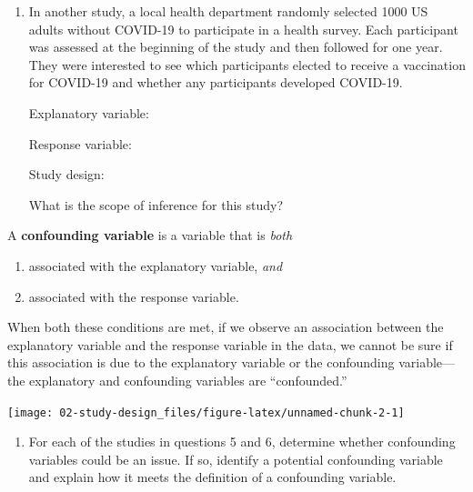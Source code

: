 \documentclass[
]{report}
\providecommand{\tightlist}{%
  \setlength{\itemsep}{0pt}\setlength{\parskip}{0pt}}
\begin{document}
\begin{enumerate}
\def\labelenumi{\arabic{enumi}.}
\setcounter{enumi}{5}
\item
  In another study, a local health department randomly selected 1000 US adults without COVID-19 to participate in a health survey. Each participant was assessed at the beginning of the study and then followed for one year. They were interested to see which participants elected to receive a vaccination for COVID-19 and whether any participants developed COVID-19.
  \vspace{0.1in}

  Explanatory variable:
  \vspace{0.25in}

  Response variable:
  \vspace{0.25in}

  Study design:
  \vspace{0.25in}

  What is the scope of inference for this study?
  \vspace{0.5in}
\end{enumerate}

A \textbf{confounding variable} is a variable that is \emph{both}

\begin{enumerate}
\def\labelenumi{\arabic{enumi}.}
\tightlist
\item
  associated with the explanatory variable, \emph{and}
\item
  associated with the response variable.
\end{enumerate}

When both these conditions are met, if we observe an association between the explanatory variable and the response variable in the data, we cannot be sure if this association is due to the explanatory variable or the confounding variable---the explanatory and confounding variables are ``confounded.''

\begin{center}\texttt{[image: 02-study-design\_files/figure-latex/unnamed-chunk-2-1]} \end{center}

\begin{enumerate}
\def\labelenumi{\arabic{enumi}.}
\setcounter{enumi}{6}
\tightlist
\item
  For each of the studies in questions 5 and 6, determine whether confounding variables could be an issue. If so, identify a potential confounding variable and explain how it meets the definition of a confounding variable.
  \vspace{1.5in}
\end{enumerate}
\end{document}

